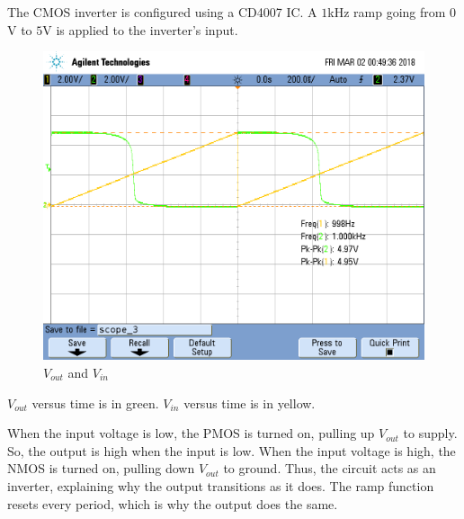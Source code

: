 The CMOS inverter is configured using a CD4007 IC.
A $1$\si{\kilo\hertz} ramp going from $0$\si{\volt} to $5$\si{\volt} is applied to the inverter's input.

\FloatBarrier

\begin{figure}[h!]
	\centering
	\includegraphics[scale=0.50]{../images/vout_and_vin_inverter_alt.png}
	\caption{$V_{out}$ and $V_{in}$}
	\label{fig:vout_and_vin_inverter_alt}
\end{figure}

\FloatBarrier

{\footnotesize $V_{out}$ versus time is in green. $V_{in}$ versus time is in yellow.}

\FloatBarrier

When the input voltage is low, the PMOS is turned on, pulling up $V_{out}$ to supply.
So, the output is high when the input is low.
When the input voltage is high, the NMOS is turned on, pulling down $V_{out}$ to ground.
Thus, the circuit acts as an inverter, explaining why the output transitions as it does.
The ramp function resets every period, which is why the output does the same.

\FloatBarrier

